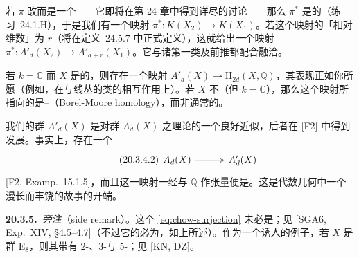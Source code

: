 若 $\pi$ 改而是一个\trFlat\trMorphism——它即将在第 24 章中得到详尽的讨论——那么 $\pi^*$ 是\trExact{}的（\mbox{练习~24.1.H}），于是我们有一个映射 $\pi^*\colon K(X_2)\to K(X_1)$。若这个映射的「相对维数」为 $r$（将在\mbox{定义~24.5.7} 中正式定义），这就给出一个映射 $\pi^*\colon A'_d(X_2)\to A'_{d+r}(X_1)$。它与诸第一\trChern{}类及\trProper{}前推都配合融洽。

若 $k=\mathbb{C}$ 而 $X$ 是\trProper{}的，则存在一个映射 $A'_d(X)\to\mathrm{H}_{2d}(X,\mathbb{Q})$，其表现正如你所愿（例如，在与线丛的\trChern{}类的相互作用上）。若 $X$ 不\trProper（但 $k=\mathbb{C}$），那么这个映射所指向的是\trBorel--\trMoore\trHomology（Borel-Moore homology），而非通常的\trHomology。

我们的群 $A'_d(X)$ 是对\trChow{}群 $A_d(X)$ 之理论的一个良好近似，后者在 [F2] 中得到发展。事实上，存在一个\trSurjectiveMap
\begin{equation*}\tag{20.3.4.2}\label{eq:chow-surjection}
\begin{tikzcd}[column sep=3em]
A_d(X)\ar[r,two heads]&A'_d(X)
\end{tikzcd}
\end{equation*}
[F2, Examp.~15.1.5]，而且这一映射一经与 $\mathbb{Q}$ 作张量便是。这是代数几何中一个漫长而丰饶的故事的开端。

\textbf{20.3.5.}\ \emph{旁注}（side remark）。\quad 这个\trSurjectiveMap{} \eqref{eq:chow-surjection} 未必是\trIsomorphism；见 [SGA6, Exp.~XIV, \S4.5--4.7]（不过它的\trKernel{}必为\trTorsion，如上所述）。作为一个诱人的例子，若 $X$ 是群 $\mathrm{E}_8$，则其\trKernel{}带有 $2$-\trTorsion、$3$-\trTorsion{}与 $5$-\trTorsion；见 [KN, DZ]。
